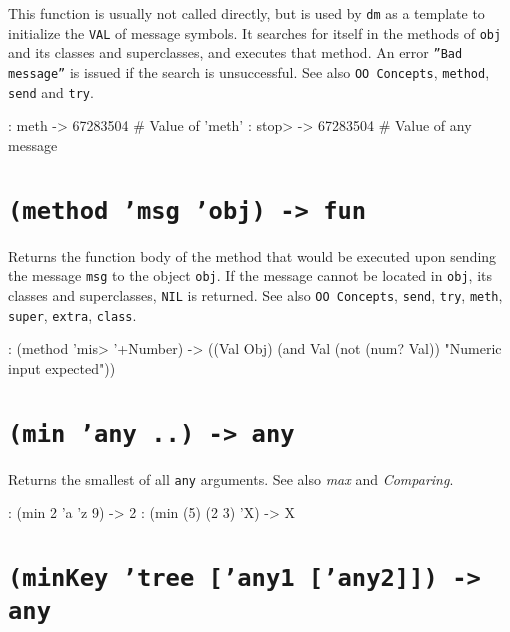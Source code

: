 This function is usually not called directly, but is used by \texttt{dm} as a
template to initialize the \texttt{VAL} of message symbols. It searches for
itself in the methods of \texttt{obj} and its classes and superclasses, and
executes that method. An error \texttt{''Bad message''} is issued if the search
is unsuccessful. See also \texttt{OO Concepts}, \texttt{method}, \texttt{send} and \texttt{try}.


\begin{wideverbatim}
: meth
-> 67283504    # Value of 'meth'
: stop>
-> 67283504    # Value of any message
\end{wideverbatim}

 
\section*{\texttt{(method 'msg 'obj) -> fun}}
\label{sec:func-ref-M-(method 'msg 'obj) -> fun}


Returns the function body of the method that would be executed upon
sending the message \texttt{msg} to the object \texttt{obj}. If the message cannot be
located in \texttt{obj}, its classes and superclasses, \texttt{NIL} is returned. See
also \texttt{OO Concepts}, \texttt{send}, \texttt{try}, \texttt{meth}, \texttt{super}, \texttt{extra}, \texttt{class}.


\begin{wideverbatim}
: (method 'mis> '+Number)
-> ((Val Obj) (and Val (not (num? Val)) "Numeric input expected"))
\end{wideverbatim}

 
\section*{\texttt{(min 'any ..) -> any}}
\label{sec:func-ref-M-(min 'any ..) -> any}


Returns the smallest of all \texttt{any} arguments. See also
\emph{max} and \emph{Comparing}.


\begin{wideverbatim}
: (min 2 'a 'z 9)
-> 2
: (min (5) (2 3) 'X)
-> X
\end{wideverbatim}

 
\section*{\texttt{(minKey 'tree ['any1 ['any2]]) -> any}}
\label{sec:func-ref-M-(minKey 'tree ['any1 ['any2]]) -> any}


